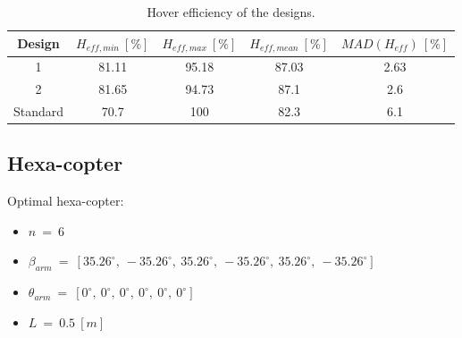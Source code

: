 \begin{table}[!h]
\begin{center}
 \caption{Torque capabilities of the designs .}\vspace{1ex}
 \label{tab:tab_Quad_compare_torque}
\end{center}
\end{table}
\begin{table}[!h]
\begin{center}
 \caption{Hover efficiency of the designs.}\vspace{1ex}
 \label{tab:tab_Quad_compare_hover}
 {\tiny\begin{tabular}{|c|cccc|}
 \hline
  Design & $H_{eff,min}\ [\%]$ & $H_{eff,max}\ [\%]$ & $H_{eff,mean}\ [\%]$
  & $MAD(H_{eff})\ [\%]$\\ \hline
  1 & 81.11 & 95.18 & 87.03 & 2.63\\
  2 & 81.65 & 94.73 & 87.1 & 2.6\\
  Standard & 70.7 & 100 & 82.3 & 6.1\\
 \hline
\end{tabular}}
\end{center}
\end{table}

\subsection{Hexa-copter}
\label{sec:hexa_copter}

Optimal hexa-copter:
\begin{itemize}
  \item $n\ =\ 6$
  \item $\beta_{arm}\ =\ [35.26^{\circ},\  -35.26^{\circ},\  35.26^{\circ},\  -35.26^{\circ},\
                          35.26^{\circ},\  -35.26^{\circ}]$
  \item $\theta_{arm}\ =\ [0^{\circ},\  0^{\circ},\  0^{\circ},\  0^{\circ},\ 0^{\circ},\  0^{\circ}]$
  \item $L\ =\ 0.5\ [m]$
\end{itemize}

